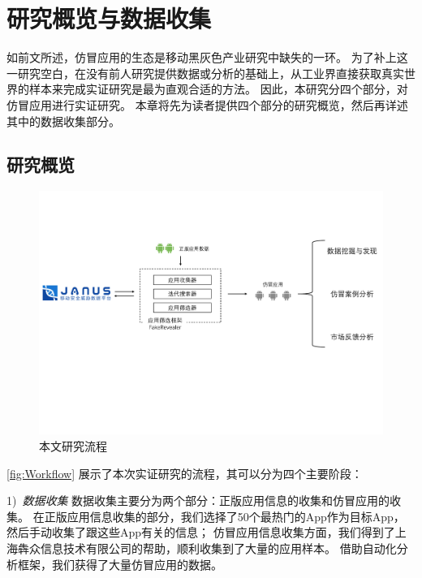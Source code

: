 \chapter{研究概览与数据收集}
\label{chp:dataCollection}

如前文所述，仿冒应用的生态是移动黑灰色产业研究中缺失的一环。
为了补上这一研究空白，在没有前人研究提供数据或分析的基础上，从工业界直接获取真实世界的样本来完成实证研究是最为直观合适的方法。
因此，本研究分四个部分，对仿冒应用进行实证研究。
本章将先为读者提供四个部分的研究概览，然后再详述其中的数据收集部分。

\section{研究概览}

\begin{figure}[htbp]
	\centering
	\includegraphics[width=\textwidth]{./Figures/edwin-overview}
	\caption{本文研究流程}
	\label{fig:Workflow}
	\vspace{-3mm}
\end{figure}

\autoref{fig:Workflow} 展示了本次实证研究的流程，其可以分为四个主要阶段：

1)\ \emph{数据收集} \quad
数据收集主要分为两个部分：正版应用信息的收集和仿冒应用的收集。
在正版应用信息收集的部分，我们选择了50个最热门的App作为目标App，然后手动收集了跟这些App有关的信息；
仿冒应用信息收集方面，我们得到了上海犇众信息技术有限公司的帮助，顺利收集到了大量的应用样本。
借助自动化分析框架\mytool，我们获得了大量仿冒应用的数据。

